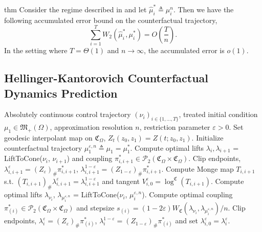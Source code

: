 \documentclass[11pt]{article}
\begin{document}
\begin{restatable}{thm}{}
    Consider the regime described in  and let $\hat{\mu}_i^* \triangleq \mu_i^n$. Then we have the following accumulated error bound on the counterfactual trajectory,
    \[\sum_{i = 1}^TW_2(\hat{\mu}_i^*, \mu_i^*) = O\left(\frac{T}{n}\right).\]
    In the setting where $T = \Theta(1)$ and $n \rightarrow \infty$, the accumulated error is $o(1)$. 
\end{restatable}


\subsection{Hellinger-Kantorovich Counterfactual Dynamics Prediction}



\begin{algorithm}[h]
    \begin{algorithmic}[1] 
        \caption{Counterfactual trajectory reconstruction on $(\mathfrak{M}_+(\Omega), \text{HK})$}
        \label{alg: HK trajectory reconstruction}
        \Require Absolutely continuous control trajectory $(\nu_i)_{i \in \{1, \dots, T\}}$, treated initial condition $\mu_1 \in \mathfrak{M}_+(\Omega)$, approximation resolution $n$, restriction parameter $\varepsilon > 0$. 
        \State Set geodesic interpolant map on $\mathfrak{C}_\Omega$, $Z_t(z_0, z_1) = Z(t; z_0, z_1)$.
        \State Initialize counterfactual trajectory $\mu_1^{\varepsilon, n} \triangleq \mu_1 = \mu_1^*$. 
            \State Compute optimal lifts $\lambda_{i}, \lambda_{i+1}$ = LiftToCone($\nu_i$, $\nu_{i+1}$) and coupling $\pi^*_{i, i+1} \in \mathcal{P}_2(\mathfrak{C}_{\Omega} \times \mathfrak{C}_{\Omega})$. 
            \State Clip endpoints, $\lambda^{\varepsilon}_{i, i+1} = (Z_\varepsilon)_\#\pi^*_{i, i+1}$, $\lambda^{1 - \varepsilon}_{i, i+1} = (Z_{1-\varepsilon})_\#\pi^*_{i, i+1}$.
            \State Compute Monge map $T_{i, i+1}$ s.t. $(T_{i, i+1})_\#\lambda^{\varepsilon}_{i, i+1} = \lambda^{1-\varepsilon}_{i, i+1}$ and tangent $V^\varepsilon_{i, 0} = \log ^{\mathfrak{C}}(T_{i, i+1})$. 
            \State Compute optimal lifts $\lambda_{\nu_{i}}$, $\lambda_{\mu^{\varepsilon, n}_{i}}$ = LiftToCone($\nu_i$, $\mu_{i}^{\varepsilon, n}$).
            \State Compute optimal coupling $\pi^*_{(i)} \in \mathcal{P}_2(\mathfrak{C}_{\Omega} \times \mathfrak{C}_{\Omega})$ and stepsize $s_{(i)} = (1-2\varepsilon)W_\mathfrak{C}(\lambda_{\nu_{i}}, \lambda_{\mu_{i}^{\varepsilon, n}})/n$. 
            \State Clip endpoints, $\lambda^{\varepsilon}_i = (Z_\varepsilon)_\#\pi^*_{(i)}$, $\lambda_{i}^{1-\varepsilon} = (Z_{1-\varepsilon})_\#\pi^*_{(i)}$ and set $\lambda_{i, 0}^\varepsilon = \lambda_i^{\varepsilon}$.

\end{algorithmic}
\end{algorithm}
\end{document}
